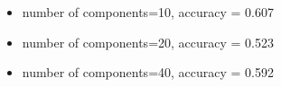 \documentclass{article} %
\begin{document}
\begin{figure}[htb]
    
\end{figure}




\begin{itemize}
    \item number of components=10, accuracy = 0.607
    \item number of components=20, accuracy = 0.523
    \item number of components=40, accuracy = 0.592
\end{itemize}
\end{document}
